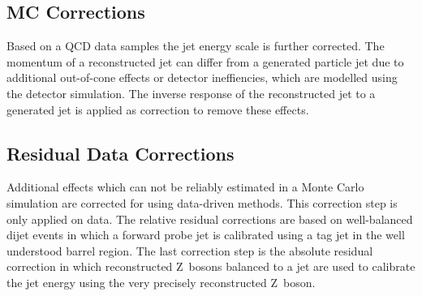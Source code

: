 \subsection{MC Corrections}

Based on a QCD data samples the jet energy scale is further corrected. The
momentum of a reconstructed jet can differ from a generated particle jet due to
additional out-of-cone effects or detector ineffiencies, which are modelled
using the detector simulation. The inverse response of the reconstructed jet to
a generated jet is applied as correction to remove these effects.

\subsection{Residual Data Corrections}

Additional effects which can not be reliably estimated in a Monte Carlo
simulation are corrected for using data-driven methods. This correction step is
only applied on data. The relative residual corrections are based on
well-balanced dijet events in which a forward probe jet is calibrated using a
tag jet in the well understood barrel region. The last correction step is the
absolute residual correction in which reconstructed Z~bosons balanced to a jet
are used to calibrate the jet energy using the very precisely reconstructed Z~boson.

